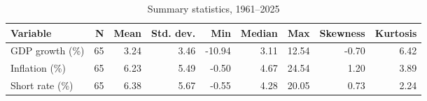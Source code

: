 \begin{table}

\caption{\label{tab:summary-stats}Summary statistics, 1961--2025}
\centering
\begin{tabular}[t]{lrrrrrrrr}
\toprule
Variable & N & Mean & Std. dev. & Min & Median & Max & Skewness & Kurtosis\\
\midrule
GDP growth (\%) & 65 & 3.24 & 3.46 & -10.94 & 3.11 & 12.54 & -0.70 & 6.42\\
Inflation (\%) & 65 & 6.23 & 5.49 & -0.50 & 4.67 & 24.54 & 1.20 & 3.89\\
Short rate (\%) & 65 & 6.38 & 5.67 & -0.55 & 4.28 & 20.05 & 0.73 & 2.24\\
\bottomrule
\end{tabular}
\end{table}
